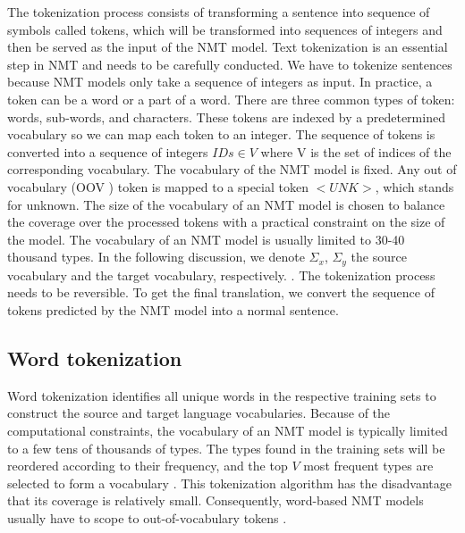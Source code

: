 The tokenization process consists of transforming a sentence into sequence of symbols called tokens, which will be transformed into sequences of integers and then be served as the input of the NMT model. Text tokenization is an essential step in NMT and needs to be carefully conducted. We have to tokenize sentences because NMT models only take a sequence of integers as input. In practice, a token can be a word or a part of a word. There are three common types of token: words, sub-words, and characters. These tokens are indexed by a predetermined vocabulary so we can map each token to an integer. The sequence of tokens is converted into a sequence of integers $IDs \in V$ where V is the set of indices of the corresponding vocabulary. The vocabulary of the NMT model is fixed. Any out of vocabulary (OOV ) token is mapped to a special token $<UNK>$, which stands for unknown. The size of the vocabulary of an NMT model is chosen to balance the coverage over the processed tokens with a practical constraint on the size of the model. The vocabulary of an NMT model is usually limited to 30-40 thousand types. In the following discussion, we denote $\Sigma_{x}$, $\Sigma_y$ the source vocabulary and the target vocabulary, respectively.  . The tokenization process needs to be reversible. To get the final translation, we convert the sequence of tokens predicted by the NMT model into a normal sentence.
\subsection{Word tokenization}
Word tokenization identifies all unique words in the respective training sets to construct the source and target language vocabularies. Because of the computational constraints, the vocabulary of an NMT model is typically limited to a few tens of thousands of types. The types found in the training sets will be reordered according to their frequency, and the top $V$ most frequent types are selected to form a vocabulary \citet{Cho14properties}. This tokenization algorithm has the disadvantage that its coverage is relatively small. Consequently, word-based NMT models usually have to scope to out-of-vocabulary tokens \citet{jean15using,luong15addressing,Li16towards}.

